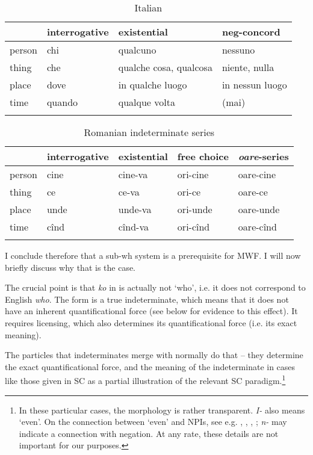 \documentclass[output=paper,colorlinks,citecolor=brown]{langscibook}
\begin{document}
\begin{table}
\begin{tabularx}{.90\textwidth}{Xlll}
\lsptoprule
& interrogative & existential & neg-concord \\\midrule
person & chi & qualcuno & nessuno\\
thing & che  & qualche cosa, qualcosa & niente, nulla\\
place & dove & in qualche luogo  & in nessun luogo\\
time  & quando  & qualque volta  & (mai)\\
\lspbottomrule
\end{tabularx}
    \caption{Italian}
\label{bosk:tab:6}
\end{table}

\begin{table}
\begin{tabularx}{.85\textwidth}{Xllll}
\lsptoprule
& interrogative & existential & {free choice} & \textit{oare}-series\\\midrule
person & cine & cine-va & ori-cine & oare-cine\\
thing & ce & ce-va & ori-ce  & oare-ce\\
place & unde & unde-va & ori-unde  & oare-unde\\
time & cînd & cînd-va & ori-cînd  & oare-cînd\\
\lspbottomrule
\end{tabularx}
    \caption{Romanian indeterminate series}
\label{bosk:tab:7}
\end{table}

I conclude therefore that a sub-wh system is a prerequisite for MWF. I will now briefly discuss why that is the case.

The crucial point is that \textit{ko} in  is actually not `who', i.e. it does not correspond to English \textit{who}. The form is a true indeterminate, which means that it does not have an inherent quantificational force (see below for evidence to this effect). It requires licensing, which also determines its quantificational force (i.e. its exact meaning).

The particles that indeterminates merge with normally do that -- they determine the exact quantificational force, and the meaning of the indeterminate in cases like those given in SC  as a partial illustration of the relevant SC paradigm.\footnote{In these particular cases, the morphology is rather transparent. \textit{I-} also means `even'. On the connection between `even' and NPIs, see e.g. \citet{bos:Rooth1985}, \citet{Haspelmath1997}, \citet{Giannakidou2007}, \citet{Crnič2011}; \textit{n-} may indicate a connection with negation. At any rate, these details are not important for our purposes.}
\end{document}
